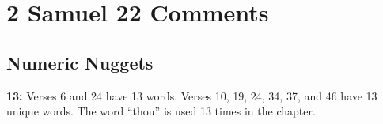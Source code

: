 \section{2 Samuel 22 Comments}

\subsection{Numeric Nuggets}
\textbf{13:} Verses 6 and 24 have 13 words. Verses 10, 19, 24, 34, 37, and 46 have 13 unique words. The word ``thou'' is used 13 times in the chapter.